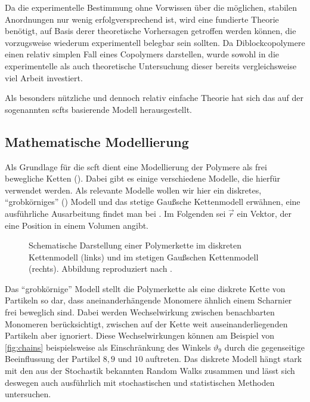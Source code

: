 Da die experimentelle Bestimmung ohne Vorwissen über die möglichen, stabilen Anordnungen nur wenig erfolgversprechend ist, wird eine fundierte Theorie benötigt, auf Basis derer theoretische Vorhersagen getroffen werden können, die vorzugsweise wiederum experimentell belegbar sein sollten.
Da Diblockcopolymere einen relativ simplen Fall eines Copolymers darstellen, wurde sowohl in die experimentelle als auch theoretische Untersuchung dieser bereits vergleichsweise viel Arbeit investiert.

Als besonders nützliche und dennoch relativ einfache Theorie hat sich das auf der sogenannten \acp{scft} basierende Modell herausgestellt.

\subsection*{Mathematische Modellierung} %

Als Grundlage für die \acl{scft} dient eine Modellierung der Polymere als frei bewegliche Ketten ().
Dabei gibt es einige verschiedene Modelle, die hierfür verwendet werden.
Als relevante Modelle wollen wir hier ein diskretes, \enquote{grobkörniges} () Modell und das stetige Gaußsche Kettenmodell erwähnen, eine ausführliche Ausarbeitung findet man bei \textcites[Chapter 2]{Fredrickson:2006th}{rubinstein2003polymer}.
Im Folgenden sei $\vec{r}$ ein Vektor, der eine Position in einem Volumen angibt.

\begin{figure}[tb]
    \centering
        
    \caption[%
        Polymerkette in diskretem und Gaußschen Kettenmodell
    ]{%
        Schematische Darstellung einer Polymerkette im diskreten Kettenmodell (links) und im stetigen Gaußschen Kettenmodell (rechts).
        Abbildung reproduziert nach \cite[Figure 2.1 und 2.5]{Fredrickson:2006th}.
    }
    \label{fig:chains}
\end{figure}

Das \enquote{grobkörnige} Modell stellt die Polymerkette als eine diskrete Kette von Partikeln so dar, dass aneinanderhängende Monomere ähnlich einem Scharnier frei beweglich sind.
Dabei werden Wechselwirkung zwischen benachbarten Monomeren berücksichtigt, zwischen auf der Kette weit auseinanderliegenden Partikeln aber ignoriert.
Diese Wechselwirkungen können am Beispiel von \autoref{fig:chains} beispielsweise als Einschränkung des Winkels $\vartheta_9$ durch die gegenseitige Beeinflussung der Partikel $8, 9$ und $10$ auftreten.
Das diskrete Modell hängt stark mit den aus der Stochastik bekannten Random Walks zusammen und lässt sich deswegen auch ausführlich mit stochastischen und statistischen Methoden untersuchen.

